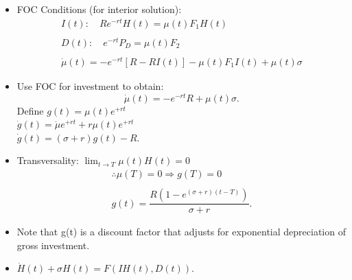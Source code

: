 \documentclass[12pt,compress,handout]{beamer}  %
\begin{document}
\begin{frame}
\begin{itemize}[<+->]
\item FOC Conditions (for interior solution):
\begin{gather*}
I(t): \quad R e^{-rt}H(t)=\mu (t)F_{1}H(t)\\
\\
D(t): \quad e^{-rt}P_{D}=\mu (t)F_{2}\\
\\
\dot{\mu}(t)=-e^{-rt}[R-RI(t)]-\mu (t)F_{1}I(t)+\mu (t)\sigma
\end{gather*}
\end{itemize}
\end{frame}


\begin{frame}
\begin{itemize}[<+->]
\item Use FOC for investment to obtain:
\begin{equation*}
\dot{\mu}(t)=-e^{-rt}R+\mu (t)\sigma .
\end{equation*}
Define $g(t)=\mu(t)e^{+rt}$\\\vspace{.2in}
$\dot{g}(t)=\dot{\mu}e^{+rt}+r\mu(t)e^{+rt}$\\\vspace{.2in}
$\dot{g}(t)=(\sigma+r)g(t)-R.$
\end{itemize}
\end{frame}


\begin{frame}
\begin{itemize}[<+->]
\item
Transversality: $\lim_{t\rightarrow T}\mu (t)H(t)=0$
\begin{gather*}
\therefore \mu (T)=0\Longrightarrow g(T)=0\\
\\
 g(t)=\dfrac{R\left(
1-e^{(\sigma+r)(t-T)}\right) }{\sigma +r}.
\end{gather*}

\item Note that g(t) is a discount factor that adjusts for exponential
depreciation of gross investment.

\item
$\dot{H}(t) + \sigma H(t) = F(IH(t),D(t))$.
\end{itemize}
\end{frame}
\end{document}
